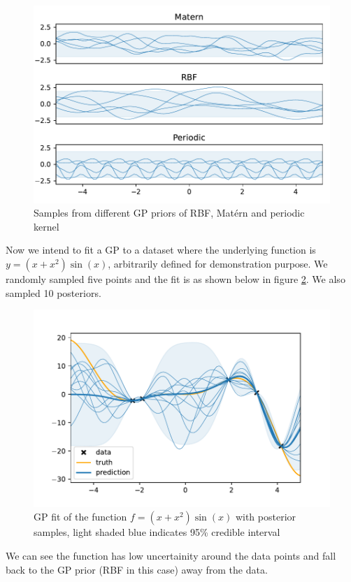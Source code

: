 \documentclass{statsmsc}
\begin{document}
\begin{figure}[H] 
  \includegraphics[width=0.8\linewidth]{../figures/prior.pdf}
  \centering
  \caption{Samples from different GP priors of RBF, Matérn and periodic kernel}
  \label{fig:prior}
\end{figure}

Now we intend to fit a GP to a dataset where the underlying function is $y=(x+x^2)\sin(x)$, arbitrarily defined for demonstration purpose.
We randomly sampled five points and the fit is as shown below in figure \ref{fig:posterior}.
We also sampled 10 posteriors.

\begin{figure}[H] 
  \includegraphics[width=0.8\linewidth]{../figures/posterior.pdf}
  \centering
  \caption{GP fit of the function $f=(x+x^2)\sin(x)$ with posterior samples, light shaded blue indicates 95\% credible interval}
  \label{fig:posterior}
\end{figure}

We can see the function has low uncertainity around the data points and fall back to the GP prior (RBF in this case) away from the data.
\end{document}

